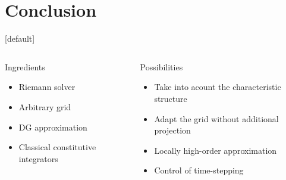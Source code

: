 \documentclass[11pt,aspectratio=1610]{beamer}
\makeatletter
\newenvironment{withoutheadline}{
  \setbeamertemplate{headline}[default]
  \def\beamer@entrycode{\vspace*{-\headheight}}
}{}
\makeatother
\begin{document}
\section*{Conclusion}
\begin{withoutheadline}
  \begin{frame}[standout]{}
    \begin{footnotesize}
      \begin{block}{}
        \begin{columns}
          \begin{column}{0.4\textwidth}
            \begin{block}{Ingredients}
              \begin{itemize}
              \item Riemann solver
              \item Arbitrary grid
              \item DG approximation
              \item Classical constitutive integrators
              \end{itemize}
            \end{block}
          \end{column}
          \begin{column}{0.5\textwidth}
            \begin{block}{Possibilities}
              \begin{itemize}
              \item Take into acount the characteristic structure
              \item Adapt the grid without additional projection
              \item Locally high-order approximation
              \item Control of time-stepping
              \end{itemize}
            \end{block}
          \end{column}
        \end{columns}
      \end{block}
    \end{footnotesize}
  \end{frame}
\end{withoutheadline}
\end{document}
